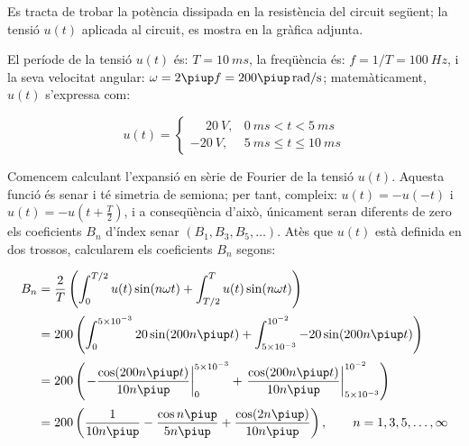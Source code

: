\begin{exemple}\label{ex:CircuitFourier}
	\addcontentsxms{\CircuitFourier}
     Es tracta de trobar la potència
     dissipada en la resistència del circuit següent; la tensió $u(t)$ aplicada al circuit,
     es mostra en la gràfica adjunta.

    \begin{center}
        
    \end{center}

     El període de la tensió $u(t)$ és: $T=\qty{10}{ms}$, la freqüència és: $f=1/T=\qty{100}{Hz}$, i la
    seva velocitat angular: $\omega = 2\piup f = 200\piup\unit{\,rad/s}$;
    matemàticament, $u(t)$ s'expressa com:

    \[
    u(t) = \begin{cases} \phantom{-}\qty{20}{V}, & \qty{0}{ms} < t < \qty{5}{ms} \\
           \qty{-20}{V}, & \qty{5}{ms} \leq t \leq \qty{10}{ms} \end{cases}
    \]

    Comencem calculant l'expansió en sèrie de Fourier de la tensió
    $u(t)$. Aquesta funció és senar i té simetria de semiona; per tant,
     compleix: $u(t)=-u(-t)$ i $u(t) = -u(t+\frac{T}{2})$, i a conseqüència   d'això, únicament seran diferents de zero els coeficients $B_n$ d'índex senar $(B_1,B_3,B_5,\ldots)$. Atès que
    $u(t)$ està definida en dos trossos, calcularem els coeficients
    $B_n$ segons:

    \[
    \begin{split}
        B_n &= \frac{2}{T} \left( \int_0^{T/2} u(t) \sin(n \omega t) +
        \int_{T/2}^{T} u(t) \sin(n \omega t) \right) \\[0.5ex]
        &= 200 \left( \int_0^{5\times 10^{-3}} 20 \sin(200 n \piup t) +
        \int_{5\times 10^{-3}}^{10^{-2}} -20 \sin(200 n \piup t) \right) \\[0.5ex]
        &= 200 \left( \left. -\frac{\cos(200 n \piup t)}{10 n \piup}\right|_0^{5\times 10^{-3}}
        +  \left.\frac{\cos(200 n \piup t)}{10 n \piup}\right|_{5\times
        10^{-3}}^{10^{-2}}\right) \\[0.5ex]
        &= 200\left( \frac{1}{10 n \piup} - \frac{\cos n \piup}{5 n \piup} +
        \frac{\cos (2 n \piup)}{10 n \piup}\right),
        \qquad n=1,3,5,\ldots,\infty
    \end{split}
    \]


\end{exemple}
